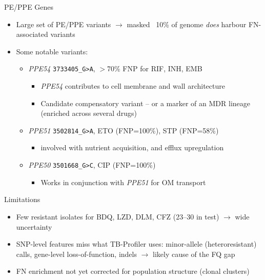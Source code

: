 \documentclass[pdf]{beamer} %
\begin{document}
\begin{frame}{PE/PPE Genes}
      \begin{itemize}
        \item Large set of PE/PPE variants $\rightarrow$ masked ~10\% of genome \textit{does} harbour FN-associated variants
        \item Some notable variants:
          \begin{itemize}
            \item \textit{PPE54} \texttt{3733405\_G>A}, $>$70\% FNP for RIF, INH, EMB
            \begin{itemize}
              \item \textit{PPE54} contributes to cell membrane and wall architecture
              \item Candidate compensatory variant -- or a marker of an MDR lineage (enriched across several drugs)
            \end{itemize}
            \item \textit{PPE51} \texttt{3502814\_G>A}, ETO (FNP=100\%), STP (FNP=58\%)
              \begin{itemize}
                \item involved with nutrient acquisition, and efflux upregulation
              \end{itemize}
            \item \textit{PPE50} \texttt{3501668\_G>C}, CIP (FNP=100\%)
              \begin{itemize}
                \item Works in conjunction with \textit{PPE51} for OM transport
              \end{itemize}
              
          \end{itemize}
          
      \end{itemize}
\end{frame}

\begin{frame}{Limitations}
  \begin{itemize}
    \item Few resistant isolates for BDQ, LZD, DLM, CFZ (23--30 in test) $\rightarrow$ wide uncertainty
    \item SNP-level features miss what TB-Profiler uses: minor-allele (heteroresistant) calls,
          gene-level loss-of-function, indels $\rightarrow$ likely cause of the FQ gap
    \item FN enrichment not yet corrected for population structure (clonal clusters)
  \end{itemize}
\end{frame}
\end{document}
